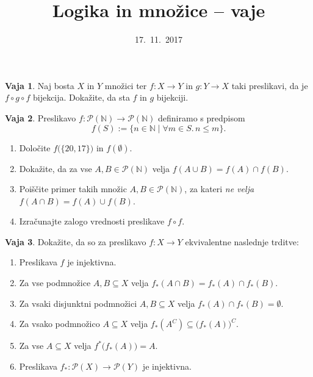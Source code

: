 \documentclass{article}
\newcommand{\NN}{\mathbb{N}}
\theoremstyle{definition}
\newtheorem{vaja}{Vaja}
\begin{document}
\title{Logika in množice -- vaje}
\date{17.~11.~2017}
\maketitle

\begin{vaja}
  Naj bosta $X$ in $Y$ množici ter $f\colon X \to Y$ in $g\colon Y \to X$ taki preslikavi, da je $f \circ g \circ f$ bijekcija. Dokažite, da sta $f$ in $g$ bijekciji.
\end{vaja}

\begin{vaja}
	Preslikavo $f\colon \mathcal{P}(\NN) \to \mathcal{P}(\NN)$ definiramo s predpisom
	\[f(S) := \{n \in \mathbb{N} \mid \forall m \in S.\, n \leq m\}.\]
	\begin{enumerate}
		\item Določite $f\big(\{20,17\}\big)$ in $f(\emptyset)$.
		\item Dokažite, da za vse $A, B \in \mathcal{P}(\mathbb{N})$ velja $f(A \cup B) = f(A) \cap f(B)$.
		\item Poiščite primer takih množic $A, B \in \mathcal{P}(\mathbb{N})$, za kateri \emph{ne velja} $f(A \cap B) = f(A) \cup f(B)$.
		\item Izračunajte zalogo vrednosti preslikave $f \circ f$.
	\end{enumerate}
\end{vaja}

\begin{vaja}
  Dokažite, da so za preslikavo $f\colon X \to Y$ ekvivalentne naslednje trditve:
  \begin{enumerate}
    \item Preslikava $f$ je injektivna.
    \item Za vse podmnožice $A, B \subseteq X$ velja $f_*(A \cap B) = f_*(A) \cap f_*(B)$.
    \item Za vsaki disjunktni podmnožici $A, B \subseteq X$ velja $f_*(A) \cap f_*(B) = \emptyset$.
    \item Za vsako podmnožico $A \subseteq X$ velja $f_*(A^C) \subseteq \big(f_*(A)\big)^C$.
    \item Za vse $A \subseteq X$ velja $f^{*}\big(f_*(A)\big) = A$.
    \item Preslikava $f_* \colon \mathcal{P}(X) \to \mathcal{P}(Y)$ je injektivna.
  \end{enumerate}
\end{vaja}
\end{document}
